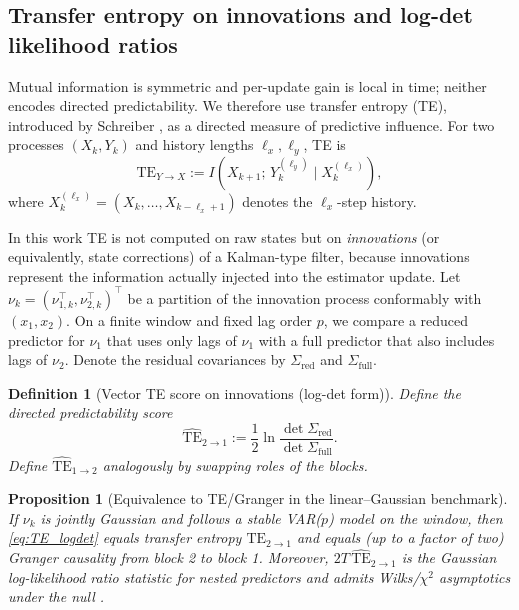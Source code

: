 \documentclass[final,5p,times,twocolumn]{elsarticle}
\newtheorem{proposition}{Proposition}
\newtheorem{definition}{Definition}
\begin{document}
\subsection{Transfer entropy on innovations and log-det likelihood ratios}

Mutual information is symmetric and per-update gain is local in time; neither encodes directed predictability. We therefore use transfer entropy (TE), introduced by Schreiber \citep{Schreiber2000_PRL}, as a directed measure of predictive influence. For two processes $(X_k,Y_k)$ and history lengths $\ell_x,\ell_y$, TE is
\begin{equation}
	\mathrm{TE}_{Y\to X}
	:= I\!\left(X_{k+1};\,Y_k^{(\ell_y)} \mid X_k^{(\ell_x)}\right),
	\label{eq:TE_def}
\end{equation}
where $X_k^{(\ell_x)}=(X_k,\dots,X_{k-\ell_x+1})$ denotes the $\ell_x$-step history.

In this work TE is not computed on raw states but on \emph{innovations} (or equivalently, state corrections) of a Kalman-type filter, because innovations represent the information actually injected into the estimator update. Let $\nu_k=(\nu_{1,k}^\top,\nu_{2,k}^\top)^\top$ be a partition of the innovation process conformably with $(x_1,x_2)$. On a finite window and fixed lag order $p$, we compare a reduced predictor for $\nu_{1}$ that uses only lags of $\nu_{1}$ with a full predictor that also includes lags of $\nu_{2}$. Denote the residual covariances by $\Sigma_{\mathrm{red}}$ and $\Sigma_{\mathrm{full}}$.

\begin{definition}[Vector TE score on innovations (log-det form)]
	\label{def:TE_logdet}
	Define the directed predictability score
	\begin{equation}
		\widehat{\mathrm{TE}}_{2\to 1}
		:= \frac{1}{2}\ln\frac{\det\Sigma_{\mathrm{red}}}{\det\Sigma_{\mathrm{full}}}.
		\label{eq:TE_logdet}
	\end{equation}
	Define $\widehat{\mathrm{TE}}_{1\to 2}$ analogously by swapping roles of the blocks.
\end{definition}

\begin{proposition}[Equivalence to TE/Granger in the linear--Gaussian benchmark]
	\label{prop:TE_Granger}
	If $\nu_k$ is jointly Gaussian and follows a stable VAR($p$) model on the window, then \eqref{eq:TE_logdet} equals transfer entropy $\mathrm{TE}_{2\to 1}$ and equals (up to a factor of two) Granger causality from block 2 to block 1. Moreover, $2T\,\widehat{\mathrm{TE}}_{2\to 1}$ is the Gaussian log-likelihood ratio statistic for nested predictors and admits Wilks/$\chi^2$ asymptotics under the null \citep{Barnett2009_PRL}.
\end{proposition}
\end{document}
